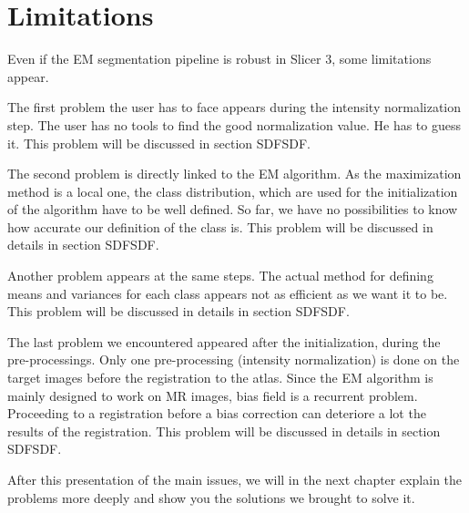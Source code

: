 \section{Limitations}\label{su:limitations}
Even if the EM segmentation pipeline is robust in Slicer 3, some limitations appear.
\par
The first problem the user has to face appears during the intensity normalization step. The user has no tools to find the good normalization value. He has to guess it. This problem will be discussed in section SDFSDF.
\par
The second problem is directly linked to the EM algorithm. As the maximization method is a local one, the class distribution, which are used for the initialization of the algorithm have to be well defined. So far, we have no possibilities to know how accurate our definition of the class is. This problem will be discussed in details in section SDFSDF.
\par
Another problem appears at the same steps. The actual method for defining means and variances for each class appears not as efficient as we want it to be. This problem will be discussed in details in section SDFSDF.
\par 
The last problem we encountered appeared after the initialization, during the pre-processings. Only one pre-processing (intensity normalization) is done on the target images before the registration to the atlas. Since the EM algorithm is mainly designed to work on MR images, bias field is a recurrent problem. Proceeding to a registration before a bias correction can deteriore a lot the results of the registration. This problem will be discussed in details in section SDFSDF.\\

%
\par
After this presentation of the main issues, we will in the next chapter explain the problems more deeply and show you the solutions we brought to solve it.
